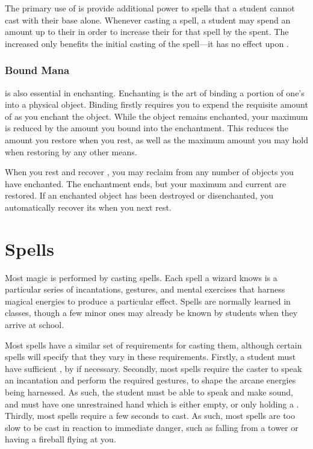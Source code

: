 The primary use of {\mana} is provide additional power to spells that a student cannot cast with their base {\focus} alone.
Whenever casting a spell, a student may spend an amount {\mana} up to their {\overchannel} in order to increase their {\focus} for that spell by the {\mana} spent.
The increased {\focus} only benefits the initial casting of the spell---it has no effect upon {\concentration}.

\subsubsection{Bound Mana}

\capital{\mana} is also essential in enchanting.
Enchanting is the art of binding a portion of one's {\mana} into a physical object.
Binding {\mana} firstly requires you to expend the requisite amount of {\mana} as you enchant the object.
While the object remains enchanted, your maximum {\mana} is reduced by the amount you bound into the enchantment.
This reduces the amount you restore when you rest, as well as the maximum amount you may hold when restoring {\mana} by any other means.

When you rest and recover {\mana}, you may reclaim {\mana} from any number of objects you have enchanted.
The enchantment ends, but your maximum and current {\mana} are restored.
If an enchanted object has been destroyed or disenchanted, you automatically recover its {\mana} when you next rest.

\section{Spells}

Most magic is performed by casting spells.
Each spell a wizard knows is a particular series of incantations, gestures, and mental exercises that harness magical energies to produce a particular effect.
Spells are normally learned in classes, though a few minor ones may already be known by students when they arrive at school.

Most spells have a similar set of requirements for casting them, although certain spells will specify that they vary in these requirements.
Firstly, a student must have sufficient {\focus}, by {\overchannelling} if necessary.
Secondly, most spells require the caster to speak an incantation and perform the required gestures, to shape the arcane energies being harnessed.
As such, the student must be able to speak and make sound, and must have one unrestrained hand which is either empty, or only holding a {\castingtool}.
Thirdly, most spells require a few seconds to cast.
As such, most spells are too slow to be cast in reaction to immediate danger, such as falling from a tower or having a fireball flying at you.

